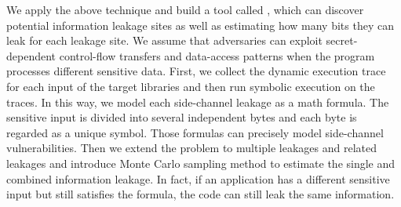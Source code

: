 We apply the above technique and build a tool called \tool{},
which can discover potential information leakage sites
as well as estimating how many bits they can leak for each leakage site.
We assume that adversaries can exploit secret-dependent control-flow transfers and
data-access patterns when the program processes different sensitive data.
First, we collect the dynamic execution trace for each input of the target libraries
and then run symbolic execution on the traces.
In this way, we model each side-channel leakage as a math formula.
The sensitive input is divided into several independent bytes and each byte is regarded as
a unique symbol. Those formulas can precisely model side-channel vulnerabilities.
Then we extend the problem to multiple leakages and related leakages
and introduce Monte Carlo sampling method to estimate the single and combined information leakage.
In fact, if an application has a different sensitive input but still satisfies the formula,
the code can still leak the same information.





